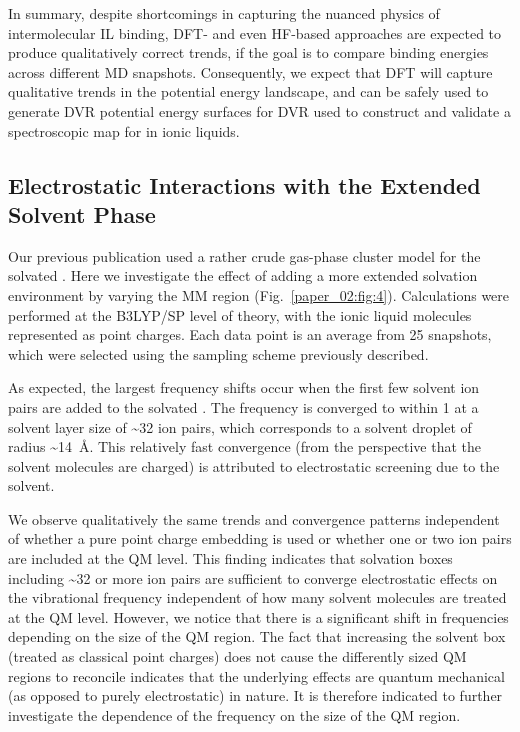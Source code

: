 In summary, despite shortcomings in capturing the nuanced physics of intermolecular \textendash{}IL binding, DFT- and even HF-based approaches are expected to produce qualitatively correct trends, if the goal is to compare binding energies across different MD snapshots.  Consequently, we expect that DFT will capture qualitative trends in the potential energy landscape, and can be safely used to generate DVR potential energy surfaces for DVR used to construct and validate a spectroscopic map for  in ionic liquids.

\subsection{Electrostatic Interactions with the Extended Solvent Phase}
\label{paper_02:ssec:IIID}

Our previous publication\cite{Brinzer2015} used a rather crude gas-phase cluster model for the solvated . Here we investigate the effect of adding a more extended solvation environment by varying the MM region (Fig.~\ref{paper_02:fig:4}). Calculations were performed at the B3LYP/SP level of theory, with the ionic liquid molecules represented as point charges. Each data point is an average from \num{25} snapshots, which were selected using the sampling scheme previously described.

As expected, the largest frequency shifts occur when the first few solvent ion pairs are added to the solvated . The frequency is converged to within \SI{1}{\wavenumber} at a solvent layer size of \textasciitilde{}\num{32} ion pairs, which corresponds to a solvent droplet of radius \textasciitilde{}\SI{14}{\angstrom}. This relatively fast convergence (from the perspective that the solvent molecules are charged) is attributed to electrostatic screening due to the solvent.

We observe qualitatively the same trends and convergence patterns independent of whether a pure point charge embedding is used or whether one or two ion pairs are included at the QM level. This finding indicates that solvation boxes including \textasciitilde{}\num{32} or more ion pairs are sufficient to converge electrostatic effects on the vibrational frequency independent of how many solvent molecules are treated at the QM level. However, we notice that there is a significant shift in frequencies depending on the size of the QM region. The fact that increasing the solvent box (treated as classical point charges) does not cause the differently sized QM regions to reconcile indicates that the underlying effects are quantum mechanical (as opposed to purely electrostatic) in nature. It is therefore indicated to further investigate the dependence of the frequency on the size of the QM region.

